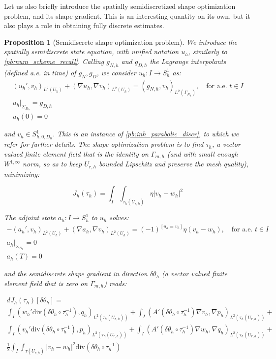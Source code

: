 \documentclass[english,a4paper,9pt,oneside]{scrbook}	%
\theoremstyle{break}
\newtheorem{prop}[equation]{Proposition}
\theoremstyle{remark}
\newcommand{\te}{\theta}
\newcommand{\dive}{\text{div}}
\begin{document}
Let us also briefly introduce the spatially semidiscretized shape optimization problem, and its shape gradient. This is an interesting quantity on its own, but it also plays a role in obtaining fully discrete estimates.

\begin{prop}[Semidiscrete shape optimization problem]
\label{prop:sd_shopt}
We introduce the spatially semidiscrete state equation, with unified notation $u_h$, similarly to \cref{pb:num_scheme_recall}. Calling $g_{N,h}$ and $g_{D,h}$ the Lagrange interpolants (defined a.e. in time) of $g_N, g_D$, we consider $u_h:I \rightarrow S^1_h$ as:
\begin{align*}
\left ( u_h', v_h\right)_{L^2(U_h)} + (\nabla u_h, \nabla v_h)_{L^2(U_h)} = (g_{N,h} , v_h)_{L^2(\Gamma_{N_h})}, \quad \text{for a.e. } t \in I\\
u_h|_{\Sigma_{D_h}}=g_{D,h}\\
u_h(0)=0
\end{align*}

and $v_h \in S^1_{h,0,D_h}$. This is an instance of \cref{pb:inh_parabolic_discr}, to which we refer for further details. The shape optimization problem is to find $\tau_h$, a vector valued finite element field that is the identity on $\Gamma_{m,h}$ (and with small enough $W^{1,\infty}$ norm, so as to keep $U_{r,h}$ bounded Lipschitz and preserve the mesh quality), minimizing:

$$J_h(\tau_h)=\int_I\int_{\tau_h(U_{r,h})}\eta |v_h-w_h|^2$$

The adjoint state $a_h:I \rightarrow S^1_h$ to $u_h$ solves:
\begin{align*}
-\left ( a_h', v_h\right)_{L^2(U_h)} + (\nabla a_h, \nabla v_h)_{L^2(U_h)} = (-1)^{\left [ u_h=v_h\right ]}\eta(v_h-w_h), \quad \text{for a.e. } t \in I\\
a_h|_{\Sigma_{D_h}}=0\\
a_h(T)=0
\end{align*}

and the semidiscrete shape gradient in direction $\delta \te_h$ (a vector valued finite element field that is zero on $\Gamma_{m,h}$) reads:

\begin{align*} 
	dJ_h(\tau_h)[\delta \te_h] =\\ \int_I (w_h' \dive(\delta \te_h\circ  \tau_h^{-1}), q_h )_{L^2(\tau_h(U_{r,h}))}+ \int_I (A'(\delta\te_h \circ \tau_h^{-1})\nabla v_h, \nabla p_h)_{L^2(\tau_h(U_{r,h}))}+\\
\int_I (v_h' \dive(\delta \te_h\circ  \tau_h^{-1}), p_h )_{L^2(\tau_h(U_{r,h}))}+ \int_I (A'(\delta\te_h \circ \tau_h^{-1})\nabla w_h, \nabla q_h)_{L^2(\tau_h(U_{r,h}))}+\\
\frac{1}{2}\int_I\int_{\tau(U_{r,h})}|v_h-w_h|^2\dive(\delta \te_h\circ  \tau_h^{-1})
\end{align*}

\end{prop}
\end{document}
